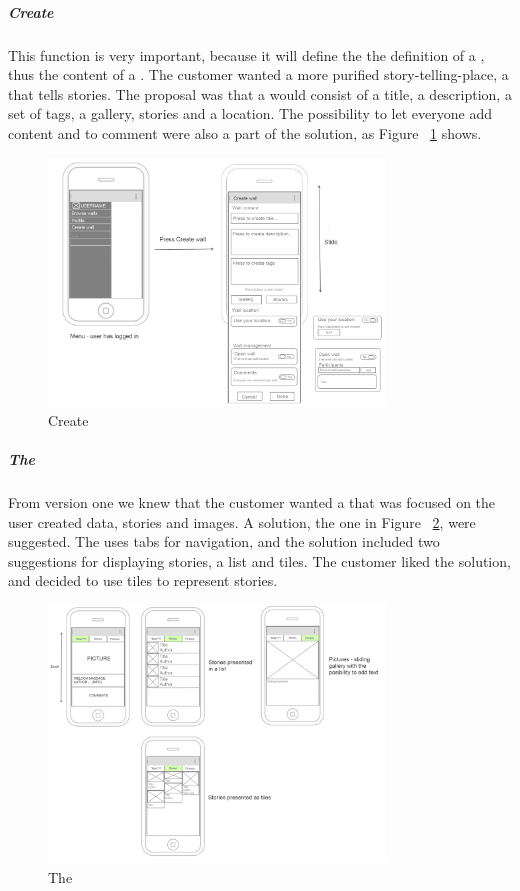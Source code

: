 \documentclass[11pt]{book}
\begin{document}
\subparagraph{Create \wallentitys}
This function is very important, because it will define the the definition of a \wallentitys, thus the content of a \wallentitys. The customer wanted a more purified story-telling-place, a \wallentitys that tells stories. The proposal was that a \wallentitys would consist of a title, a description, a set of tags, a gallery, stories and a location. The possibility to let everyone add content and to comment were also a part of the solution, as Figure ~\ref{fig:phases_sprint1_uiVersionTwoCreateWallDocument} shows.

\begin{figure}[H]
    \centering
    \includegraphics[width=0.8\textwidth]{Figures/Phases/Sprint1/createWallDocument.png}
    \caption{Create \wallentitys}
    \label{fig:phases_sprint1_uiVersionTwoCreateWallDocument}
\end{figure}

\subparagraph{The \wallentitys}
From version one we knew that the customer wanted a \wallentitys that was focused on the user created data, stories and images. A solution, the one in Figure ~\ref{fig:phases_sprint1_uiVersionTwoWallFunctions}, were suggested. The \wallentitys uses tabs for navigation, and the solution included two suggestions for displaying stories, a list and tiles. The customer liked the solution, and decided to use tiles to represent stories.

\begin{figure}[H]
    \centering
    \includegraphics[width=0.8\textwidth]{Figures/Phases/Sprint1/wallFunctions.png}
    \caption{The \wallentitys}
    \label{fig:phases_sprint1_uiVersionTwoWallFunctions}
\end{figure}
\end{document}

